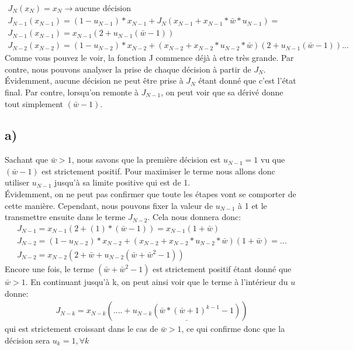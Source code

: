 \documentclass[oneside]{book}
\begin{document}
\begin{align*}
J_N(x_N) = x_N \rightarrow \text{aucune décision}\\
J_{N-1}(x_{N-1}) = (1-u_{N-1})*x_{N-1} + J_N(x_{N-1} + x_{N-1}*\bar{w}*u_{N-1}) =\\
J_{N-1}(x_{N-1}) = x_{N-1}(2 + u_{N-1}(\bar{w} - 1))\\
J_{N-2}(x_{N-2}) = (1-u_{N-2})*x_{N-2} + (x_{N-2} + x_{N-2}*u_{N-2}*\bar{w})(2 + u_{N-1}(\bar{w}-1))... 
\end{align*} 
Comme vous pouvez le voir, la fonction J commence déjà à etre très grande. Par contre, nous pouvons analyser la prise de chaque décision à partir de $J_N$. Évidemment, aucune décision ne peut être prise à $J_N$ étant donné que c'est l'état final. Par contre, lorsqu'on remonte à $J_{N-1}$, on peut voir que sa dérivé donne tout simplement $(\bar{w} - 1)$.\\

\subsection*{a)}
Sachant que $\bar{w} > 1$, nous savons que la première décision est $u_{N-1} = 1$ vu que $(\bar{w} - 1)$ est strictement positif. Pour maximiser le terme nous allons donc utiliser $u_{N-1}$ jusqu'à sa limite positive qui est de 1.\\

Évidemment, on ne peut pas confirmer que toute les étapes vont se comporter de cette manière. Cependant, nous pouvons fixer la valeur de $u_{N-1}$ à 1 et le transmettre ensuite dans le terme $J_{N-2}$. Cela nous donnera donc:\\

\begin{align*}
J_{N-1} = x_{N-1}(2 + (1)*(\bar{w} - 1)) = x_{N-1}(1 + \bar{w})\\
J_{N-2} = (1 - u_{N-2})*x_{N-2} + (x_{N-2} + x_{N-2}*u_{N-2}*\bar{w})(1 + \bar{w}) = ...\\
J_{N-2} = x_{N-2}(2 + \bar{w} + u_{N-2}(\bar{w} + \bar{w}^2 - 1))
\end{align*}
Encore une fois, le terme $(\bar{w} + \bar{w}^2 - 1)$ est strictement positif étant donné que $\bar{w} > 1$. En continuant jusqu'à k, on peut ainsi voir que le terme à l'intérieur du $u$ donne:\\

\begin{align*}
J_{N-k} = x_{N-k}(.... + \underline{u_{N-k}(\bar{w}*(\bar{w} + 1)^{k-1} -1)})
\end{align*}
qui est strictement croissant dans le cas de $\bar{w} > 1$, ce qui confirme donc que la décision sera $u_k = 1 ,\forall k$
\end{document}
